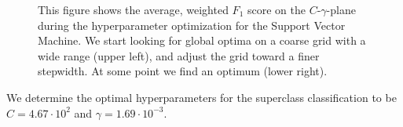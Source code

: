 \begin{figure}[H]
\hfill
{}
\hfill
{}
\hfill
{}
\hfill
\caption[Hyperparameter optimization for the Support Vector Machine (SVM)]{This figure shows the average, weighted $F_1$ score on the $C$-$\gamma$-plane during the hyperparameter optimization for the Support Vector Machine. We start looking for global optima on a coarse grid with a wide range (upper left), and adjust the grid toward a finer stepwidth. At some point we find an optimum (lower right).}
\label{fig:gridsearch-svm-superclasses}
\end{figure}

We determine the optimal hyperparameters for the superclass classification to be $C = 4.67 \cdot 10^{2}$ and $\gamma = 1.69 \cdot 10^{-3}$.

